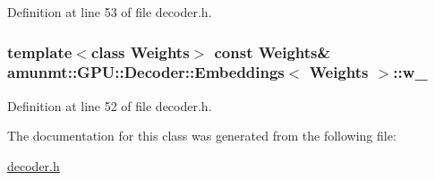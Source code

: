 Definition at line 53 of file decoder.\+h.

\subsubsection[{\texorpdfstring{w\+\_\+}{w_}}]{\setlength{\rightskip}{0pt plus 5cm}template$<$class Weights$>$ const {\bf Weights}\& {\bf amunmt\+::\+G\+P\+U\+::\+Decoder\+::\+Embeddings}$<$ {\bf Weights} $>$\+::w\+\_\+\hspace{0.3cm}{\ttfamily [private]}}\hypertarget{classamunmt_1_1GPU_1_1Decoder_1_1Embeddings_aa19afc31e320bd10be7ea1d9a0a9acc2}{}\label{classamunmt_1_1GPU_1_1Decoder_1_1Embeddings_aa19afc31e320bd10be7ea1d9a0a9acc2}


Definition at line 52 of file decoder.\+h.



The documentation for this class was generated from the following file\+:\begin{DoxyCompactItemize}
\item 
\hyperlink{decoder_8h}{decoder.\+h}\end{DoxyCompactItemize}
